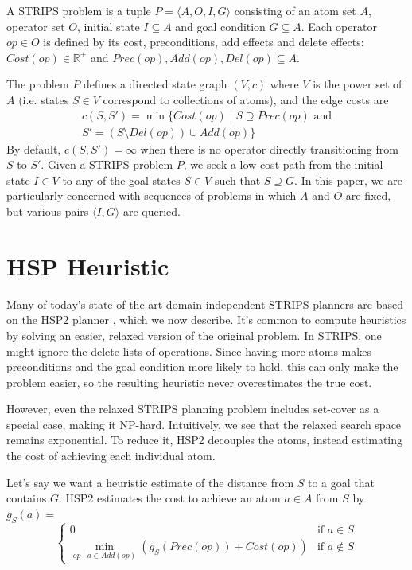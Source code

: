 \documentclass[letterpaper]{article}
\begin{document}
A STRIPS problem is a tuple $P = \langle A,O,I,G\rangle$ consisting of an atom set $A$, operator set $O$, initial state $I \subseteq A$ and goal condition $G \subseteq A$.
Each operator $op\in O$ is defined by its cost, preconditions, add effects and delete effects: $Cost(op) \in \mathbb{R}^+$ and $Prec(op),Add(op),Del(op) \subseteq A$.

The problem $P$ defines a directed state graph $(V,c)$ where $V$ is the power set of $A$ (i.e. states $S\in V$ correspond to collections of atoms), and the edge costs are
\begin{eqnarray*} c(S,S') = \min\{Cost(op) \mid S\supseteq Prec(op)\text{ and}
\\S' = \left(S \setminus Del(op)\right) \cup Add(op)\} \end{eqnarray*}
By default, $c(S,S') = \infty$ when there is no operator directly transitioning from $S$ to $S'$.
Given a STRIPS problem $P$, we seek a low-cost path from the initial state $I\in V$ to any of the goal states $S\in V$ such that $S \supseteq G$. In this paper, we are particularly concerned with sequences of problems in which $A$ and $O$ are fixed, but various pairs $\langle I,G\rangle$ are queried.

\section{HSP Heuristic}

Many of today's state-of-the-art domain-independent STRIPS planners are based on the HSP2 planner \cite{bonet2001planning}, which we now describe.
It's common to compute heuristics by solving an easier, relaxed version of the original problem. In STRIPS, one might ignore the delete lists of operations.
Since having more atoms makes preconditions and the goal condition more likely to hold, this can only make the problem easier, so the resulting heuristic never overestimates the true cost.

However, even the relaxed STRIPS planning problem includes set-cover as a special case, making it NP-hard.
Intuitively, we see that the relaxed search space remains exponential.
To reduce it, HSP2 decouples the atoms, instead estimating the cost of achieving each individual atom.

Let's say we want a heuristic estimate of the distance from $S$ to a goal that contains $G$. HSP2 estimates the cost to achieve an atom $a\in A$ from $S$ by $g_S(a) = $
\[\begin{cases} 0  &\mbox{if } a \in S
\\ \min_{op\mid a\in Add(op)} \left(g_S(Prec(op)) + Cost(op)\right)  &\mbox{if } a \notin S \end{cases}\]
\end{document}
